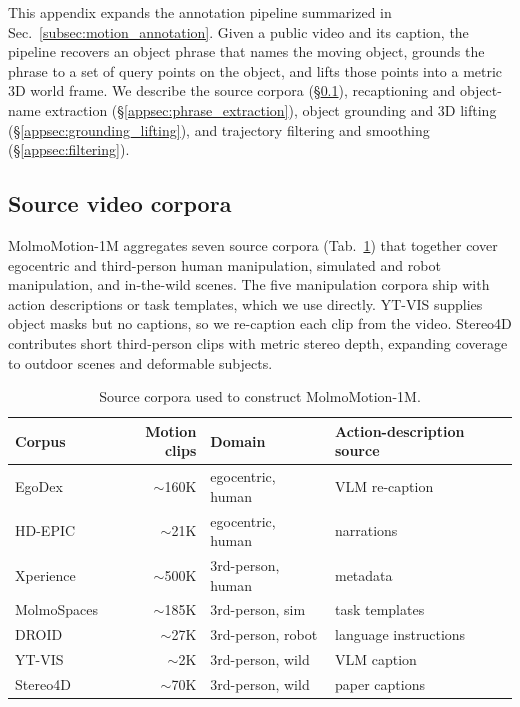 This appendix expands the annotation pipeline summarized in Sec.~\ref{subsec:motion_annotation}. Given a public video and its caption, the pipeline recovers an object phrase that names the moving object, grounds the phrase to a set of query points on the object, and lifts those points into a metric 3D world frame. We describe the source corpora (\S\ref{appsec:data_sources}), recaptioning and object-name extraction (\S\ref{appsec:phrase_extraction}), object grounding and 3D lifting (\S\ref{appsec:grounding_lifting}), and trajectory filtering and smoothing (\S\ref{appsec:filtering}).

\subsection{Source video corpora}
\label{appsec:data_sources}

MolmoMotion-1M aggregates seven source corpora (Tab.~\ref{tab:appendix-sources}) that together cover egocentric and third-person human manipulation, simulated and robot manipulation, and in-the-wild scenes. The five manipulation corpora ship with action descriptions or task templates, which we use directly. YT-VIS supplies object masks but no captions, so we re-caption each clip from the video. Stereo4D contributes short third-person clips with metric stereo depth, expanding coverage to outdoor scenes and deformable subjects.

\begin{table}[h]
  \centering
  \small
  \setlength{\tabcolsep}{4pt}
  \begin{tabular}{lrll}
    Corpus     & Motion clips            & Domain            & Action-description source \\
    \midrule
    EgoDex      & $\sim$160K              & egocentric, human & VLM re-caption \\
    HD-EPIC     & $\sim$21K               & egocentric, human & narrations \\
    Xperience   & $\sim$500K              & 3rd-person, human & metadata \\
    MolmoSpaces & $\sim$185K              & 3rd-person, sim   & task templates \\
    DROID       & $\sim$27K               & 3rd-person, robot & language instructions \\
    YT-VIS      & $\sim$2K                & 3rd-person, wild  & VLM caption \\
    Stereo4D    & $\sim$70K               & 3rd-person, wild  & paper captions \\
  \end{tabular}
  \vspace{2mm}
  \caption{Source corpora used to construct MolmoMotion-1M.}
  \label{tab:appendix-sources}
\end{table}

